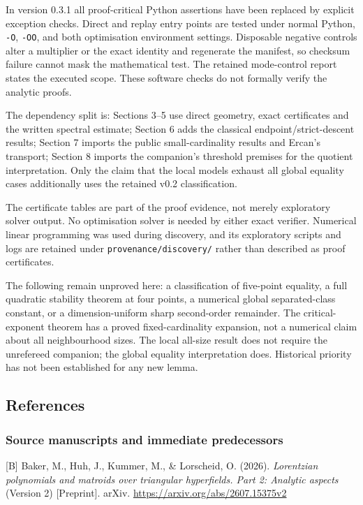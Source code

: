 \documentclass[11pt,a4paper]{article}
\begin{document}
In version 0.3.1 all proof-critical Python assertions have been replaced
by explicit exception checks. Direct and replay entry points are tested
under normal Python, \texttt{-O}, \texttt{-OO}, and both optimisation
environment settings. Disposable negative controls alter a multiplier or
the exact identity and regenerate the manifest, so checksum failure
cannot mask the mathematical test. The retained mode-control report
states the executed scope. These software checks do not formally verify
the analytic proofs.

The dependency split is: Sections 3--5 use direct geometry, exact
certificates and the written spectral estimate; Section 6 adds the
classical endpoint/strict-descent results; Section 7 imports the public
small-cardinality results and Ercan's transport; Section 8 imports the
companion's threshold premises for the quotient interpretation. Only the
claim that the local models exhaust all global equality cases
additionally uses the retained v0.2 classification.

The certificate tables are part of the proof evidence, not merely
exploratory solver output. No optimisation solver is needed by either
exact verifier. Numerical linear programming was used during discovery,
and its exploratory scripts and logs are retained under
\texttt{provenance/discovery/} rather than described as proof
certificates.

The following remain unproved here: a classification of five-point
equality, a full quadratic stability theorem at four points, a numerical
global separated-class constant, or a dimension-uniform sharp
second-order remainder. The critical-exponent theorem has a proved
fixed-cardinality expansion, not a numerical claim about all
neighbourhood sizes. The local all-size result does not require the
unrefereed companion; the global equality interpretation does.
Historical priority has not been established for any new lemma.

\subsection{References}\label{references}

\subsubsection{Source manuscripts and immediate
predecessors}\label{source-manuscripts-and-immediate-predecessors}

{[}B{]} Baker, M., Huh, J., Kummer, M., \& Lorscheid, O. (2026).
\emph{Lorentzian polynomials and matroids over triangular hyperfields.
Part 2: Analytic aspects} (Version 2) {[}Preprint{]}. arXiv.
\url{https://arxiv.org/abs/2607.15375v2}
\end{document}
